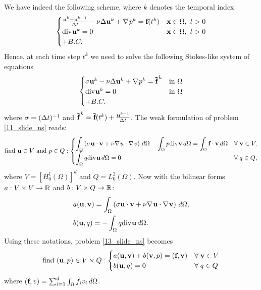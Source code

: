 We have indeed the following scheme, where \(k\) denotes the temporal index 
\begin{equation*}
    \begin{cases}
        \frac{\textbf{u}^k - \textbf{u}^{k-1}}{\Delta t} - \nu \Delta \textbf{u}^k + \nabla\mspace{1mu} p^k = \textbf{f}(t^k) & \textbf{x} \in \Omega, \ t > 0 \\
        \text{div}\mspace{1mu} \textbf{u}^k = 0 & \textbf{x} \in \Omega, \ t > 0 \\
        + B.C.
    \end{cases}
\end{equation*}
Hence, at each time step \(t^k\) we need to solve the following Stokes-like system of equations 
\begin{equation}
    \begin{cases}
        \sigma \textbf{u}^k - \nu \Delta \textbf{u}^k + \nabla\mspace{1mu} p^k = \bm{\tilde{\textbf{f}}}^{\,k} & \text{in } \Omega \\
        \text{div}\mspace{1mu} \textbf{u}^k = 0 & \text{in }\Omega \\
        + B.C.
    \end{cases}
    \label{12_slide_ns}
\end{equation}
where \(\sigma = (\Delta t)^{-1}\) and \(\bm{\tilde{\textbf{f}}}^{\,k} = \bm{\tilde{\textbf{f}}}(t^k) + \frac{\textbf{u}^{k-1}}{\Delta t}\).
The weak formulation of problem \eqref{11_slide_ns} reads: 
\begin{equation}
    \text{find } \textbf{u} \in V \text{ and } p \in Q : 
    \begin{cases}
        \displaystyle \int_\Omega \left( \sigma \textbf{u} \cdot \textbf{v} + \nu \nabla\mspace{1mu} u \cdot \nabla\mspace{1mu} v \right) \, d\Omega - \int_\Omega p \text{div}\mspace{1mu} \textbf{v} \, d\Omega = \int_\Omega \textbf{f} \cdot \textbf{v} \, d\Omega & \forall \; \textbf{v} \in V, \\
        \displaystyle \int_\Omega q \text{div}\mspace{1mu} \textbf{u} \, d\Omega = 0 & \forall \; q \in Q,
    \end{cases}
    \label{13_slide_ns}
\end{equation} 
where \(V = \left[ H^1_0(\Omega) \right]^d\) and \(Q = L^2_0(\Omega)\). Now with the bilinear forms \(a : V \times V \to \mathbb{R}\) and \(b:V\times Q \to \mathbb{R}\):
\begin{equation}
    \begin{aligned}
        &a(\textbf{u}, \textbf{v}) = \int_\Omega \left( \sigma \textbf{u} \cdot \textbf{v} + \nu \nabla\mspace{1mu} \textbf{u} \cdot \nabla\mspace{1mu} \textbf{v} \right) \, d\Omega, \\
        &b(\textbf{u}, q) = -\int_\Omega q\text{div}\mspace{1mu}\textbf{u} \, d\Omega.
    \end{aligned}
    \label{14_slide_ns}
\end{equation}
Using these notations, problem \eqref{13_slide_ns} becomes
\begin{equation}
    \text{find }(\textbf{u},p) \in V \times Q:
    \begin{cases}
        a(\textbf{u},\textbf{v}) + b(\textbf{v}, p) =  (\textbf{f}, \textbf{v}) & \forall \; \textbf{v} \in V \\
        b(\textbf{u}, q) = 0 &\forall \; q \in Q
    \end{cases}
    \label{15_slide_ns}
\end{equation}
where \((\textbf{f}, v) = \sum_{i=1}^{d} \int_\Omega f_iv_i \, d\Omega\).

